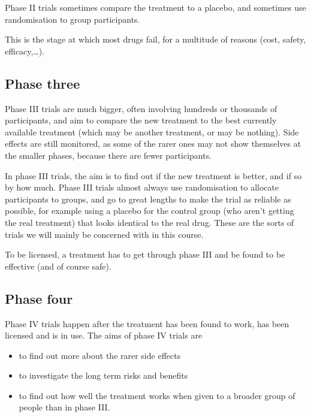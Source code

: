 \documentclass[
  openany]{book}
\providecommand{\tightlist}{%
  \setlength{\itemsep}{0pt}\setlength{\parskip}{0pt}}
\theoremstyle{definition}
\theoremstyle{definition}
\theoremstyle{definition}
\theoremstyle{definition}
\theoremstyle{remark}
\begin{document}
Phase II trials sometimes compare the treatment to a placebo, and sometimes use randomisation to group participants.

This is the stage at which most drugs fail, for a multitude of reasons (cost, safety, efficacy,\ldots).

\hypertarget{phase-three}{%
\subsection*{Phase three}\label{phase-three}}

Phase III trials are much bigger, often involving hundreds or thousands of participants, and aim to compare the new treatment to the best currently available treatment (which may be another treatment, or may be nothing). Side effects are still monitored, as some of the rarer ones may not show themselves at the smaller phases, because there are fewer participants.

In phase III trials, the aim is to find out if the new treatment is better, and if so by how much. Phase III trials almost always use randomisation to allocate participants to groups, and go to great lengths to make the trial as reliable as possible, for example using a placebo for the control group (who aren't getting the real treatment) that looks identical to the real drug. These are the sorts of trials we will mainly be concerned with in this course.

To be licensed, a treatment has to get through phase III and be found to be effective (and of course safe).

\hypertarget{phase-four}{%
\subsection*{Phase four}\label{phase-four}}

Phase IV trials happen after the treatment has been found to work, has been licensed and is in use. The aims of phase IV trials are

\begin{itemize}
\tightlist
\item
  to find out more about the rarer side effects
\item
  to investigate the long term risks and benefits
\item
  to find out how well the treatment works when given to a broader group of people than in phase III.
\end{itemize}
\end{document}
